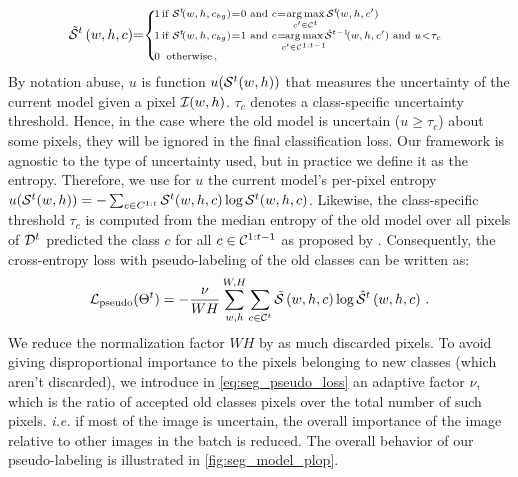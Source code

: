 \begin{equation}
    \scriptsize
    \tilde \mcS^{t}\left(w,h,c\right)\mkern-5mu = \mkern-5mu \left\{\begin{array}{ll}
        \mkern-14mu 1 \mkern-27mu & \mkern-8mu \text { if } \mcS^{t} \mkern-4mu (w,h,c_{bg})\mkern-4mu = \mkern-4mu 0 \text { and } c \mkern-4mu = \mkern-4mu \argmax \limits_{c' \in \mathcal{C}^{t}} \mcS^{t} \mkern-4mu (w,h,c')                                                                         \\
        \mkern-14mu 1 \mkern-27mu & \mkern-8mu \text { if } \mcS^{t} \mkern-4mu (w,h,c_{bg}) \mkern-4mu = \mkern-4mu 1 \text { and } c \mkern-4mu = \mkern-12mu \argmax \limits_{c' \in \mathcal{C}^{1:t-1}} \mkern-6mu \hat \mcS^{t-1} \mkern-4mu (w,h,c') \text{ and } u \mkern-4mu < \mkern-4mu \tau_{c} \\
        \mkern-14mu 0 \mkern-27mu & \mkern-4mu \,\text { otherwise\,, }                                                                                                                                                                                                                                     \\
    \end{array}\right.
    \label{eq:seg_pseudo_bis_uncertain}
\end{equation}
%
By notation abuse, $u$ is function $u(\mathcal{S}^t(w, h))$ that measures the uncertainty of the current
model given a pixel $\mathcal{I}(w,h)$. $\tau_{c}$ denotes a class-specific uncertainty threshold. Hence,
in the case where the old model is uncertain ($u \ge \tau_c$) about some pixels, they will be
ignored in the final classification loss. Our framework is agnostic to the type of uncertainty used,
but in practice we define it as the entropy. Therefore, we use for $u$ the current model's per-pixel
entropy $u(\mathcal{S}^t(w, h)) = -\sum_{c \in C^{1:t}} \mathcal{S}^t(w, h, c) \log \mathcal{S}^t(w, h, c)$. Likewise,
the class-specific threshold $\tau_c$ is computed from the median entropy of the old model over all
pixels of $\mathcal{D}^t$ predicted the class $c$ for all $c \in \mathcal{C}^{1:t-1}$ as proposed by
\cite{saporta2020esl}. Consequently, the cross-entropy loss with pseudo-labeling of the old classes
can be written as:
%
\begin{equation}
    \mathcal{L}_\text{pseudo}(\Theta^t)=- \frac{\nu}{WH} \sum_{w,h}^{W,H} \sum_{c \in \mathcal{C}^{t}} \tilde {\mathcal{S}}\left(w,h,c\right) \log \hat {\mathcal{S}}^{t}\left(w,h,c\right)\,.
    \label{eq:seg_pseudo_loss}
\end{equation}
%
We reduce the normalization factor $WH$ by as much discarded pixels. To avoid giving disproportional
importance to the pixels belonging to new classes (which aren't discarded), we introduce in
\autoref{eq:seg_pseudo_loss} an adaptive factor $\nu$, which is the ratio of accepted old classes
pixels over the total number of such pixels. \textit{i.e.} if most of the image is uncertain, the
overall importance of the image relative to other images in the batch is reduced. The overall
behavior of our pseudo-labeling is illustrated in \autoref{fig:seg_model_plop}.

